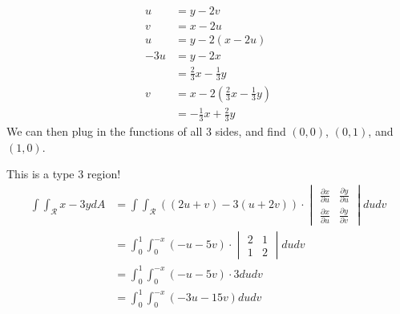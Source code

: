 \documentclass{article}
\begin{document}
\begin{solution}{}{}
    \begin{align*}
        u&=y-2v\\
        v&=x-2u\\
        u&=y-2(x-2u) \\
        -3u&=y-2x \\
        &=\frac{2}{3}x-\frac{1}{3}y \\
        v&=x-2\left(\frac{2}{3}x-\frac{1}{3}y\right) \\
        &=-\frac{1}{3}x+\frac{2}{3}y
    \end{align*}
    We can then plug in the functions of all 3 sides, and find $(0,0)$, $(0,1)$, and $(1,0)$.
    \begin{center}
        \end{center}
        This is a type 3 region!
        \begin{align*}
            \int\int_{\mathcal{R}} x-3y dA&=\int\int_{\mathcal{R}}((2u+v)-3(u+2v))\cdot\begin{vmatrix}
                \frac{\partial x}{\partial u} & \frac{\partial y}{\partial u} \\
                \frac{\partial x}{\partial u} & \frac{\partial y}{\partial v}
                \end{vmatrix}dudv\\
                &=\int_0^1\int_{0}^{-x}(-u-5v)\cdot\begin{vmatrix}
                    2 & 1 \\
                    1 & 2
                \end{vmatrix}dudv\\
                &=\int_0^1\int_{0}^{-x}(-u-5v)\cdot3 dudv\\&=\int_0^1\int_{0}^{-x}(-3u-15v) dudv
        \end{align*}
\end{solution}
\end{document}
